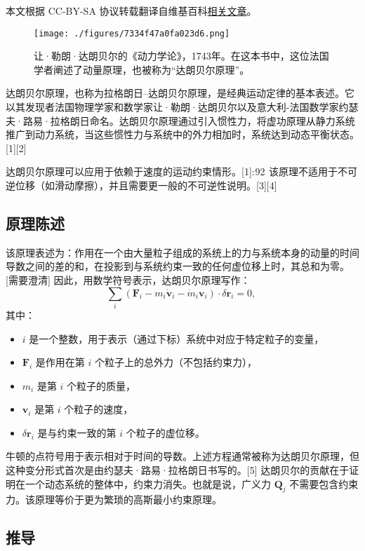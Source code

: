 
本文根据 CC-BY-SA 协议转载翻译自维基百科\href{https://en.wikipedia.org/wiki/D\%27Alembert\%27s_principle}{相关文章}。

\begin{figure}[ht]
\centering
\texttt{[image: ./figures/7334f47a0fa023d6.png]}
\caption{让·勒朗·达朗贝尔的《动力学论》，1743年。在这本书中，这位法国学者阐述了动量原理，也被称为“达朗贝尔原理”。} \label{fig_DAP_3}
\end{figure}
达朗贝尔原理，也称为拉格朗日–达朗贝尔原理，是经典运动定律的基本表述。它以其发现者法国物理学家和数学家让·勒朗·达朗贝尔以及意大利-法国数学家约瑟夫·路易·拉格朗日命名。达朗贝尔原理通过引入惯性力，将虚功原理从静力系统推广到动力系统，当这些惯性力与系统中的外力相加时，系统达到动态平衡状态。[1][2]

达朗贝尔原理可以应用于依赖于速度的运动约束情形。[1]: 92  该原理不适用于不可逆位移（如滑动摩擦），并且需要更一般的不可逆性说明。[3][4]
\subsection{原理陈述}
该原理表述为：作用在一个由大量粒子组成的系统上的力与系统本身的动量的时间导数之间的差的和，在投影到与系统约束一致的任何虚位移上时，其总和为零。[需要澄清] 因此，用数学符号表示，达朗贝尔原理写作：
\[
\sum_{i} \left( \mathbf{F}_i - m_i \dot{\mathbf{v}}_i - \dot{m}_i \mathbf{v}_i \right) \cdot \delta \mathbf{r}_i = 0,~
\]
其中：
\begin{itemize}
\item \( i \) 是一个整数，用于表示（通过下标）系统中对应于特定粒子的变量，
\item \( \mathbf{F}_i \) 是作用在第 \( i \) 个粒子上的总外力（不包括约束力），
\item \( m_i \) 是第 \( i \) 个粒子的质量，
\item \( \mathbf{v}_i \) 是第 \( i \) 个粒子的速度，
\item \( \delta \mathbf{r}_i \) 是与约束一致的第 \( i \) 个粒子的虚位移。
\end{itemize}
牛顿的点符号用于表示相对于时间的导数。上述方程通常被称为达朗贝尔原理，但这种变分形式首次是由约瑟夫·路易·拉格朗日书写的。[5] 达朗贝尔的贡献在于证明在一个动态系统的整体中，约束力消失。也就是说，广义力 \( \mathbf{Q}_j \) 不需要包含约束力。该原理等价于更为繁琐的高斯最小约束原理。
\subsection{推导}

